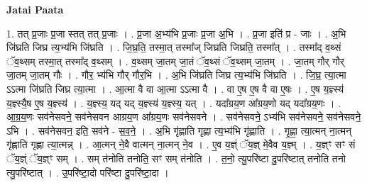 \documentclass[17pt]{extarticle}
\begin{document}
\textbf{Jatai Paata} \newline

1. तत् प्र॒जाः प्र॒जा स्तत् तत् प्र॒जाः । . प्र॒जा अ॒भ्य॑भि प्र॒जाः प्र॒जा अ॒भि । . प्र॒जा इति॑ प्र - जाः । . अ॒भि जि॑घ्रति जिघ्र त्य॒भ्य॑भि जि॑घ्रति । . जि॒घ्र॒ति॒ तस्मा॒त् तस्मा᳚ज् जिघ्रति जिघ्रति॒ तस्मा᳚त् । . तस्मा᳚द् व॒थ्सं ॅव॒थ्सम् तस्मा॒त् तस्मा᳚द् व॒थ्सम् । . व॒थ्सम् जा॒तम् जा॒तं ॅव॒थ्सं ॅव॒थ्सम् जा॒तम् । . जा॒तम् गौर् गौर् जा॒तम् जा॒तम् गौः । . गौर॒ भ्य॑भि गौर् गौर॒भि । . अ॒भि जि॑घ्रति जिघ्र त्य॒भ्य॑भि जि॑घ्रति । . जि॒घ्र॒ त्या॒त्मा ऽऽत्मा जि॑घ्रति जिघ्र त्या॒त्मा । . आ॒त्मा वै वा आ॒त्मा ऽऽत्मा वै । . वा ए॒ष ए॒ष वै वा ए॒षः । . ए॒ष य॒ज्ञ्स्य॑ य॒ज्ञ्स्यै॒ष ए॒ष य॒ज्ञ्स्य॑ । . य॒ज्ञ्स्य॒ यद् यद् य॒ज्ञ्स्य॑ य॒ज्ञ्स्य॒ यत् । . यदा᳚ग्रय॒ण आ᳚ग्रय॒णो यद् यदा᳚ग्रय॒णः । . आ॒ग्र॒य॒णः सव॑नेसवने॒ सव॑नेसवन आग्रय॒ण आ᳚ग्रय॒णः सव॑नेसवने । . सव॑नेसवने॒ ऽभ्य॑भि सव॑नेसवने॒ सव॑नेसवने॒ ऽभि । . सव॑नेसवन॒ इति॒ सव॑ने - स॒व॒ने॒ । . अ॒भि गृ॑ह्णाति गृह्णा त्य॒भ्य॑भि गृ॑ह्णाति । . गृ॒ह्णा॒ त्या॒त्मन् ना॒त्मन् गृ॑ह्णाति गृह्णा त्या॒त्मन्न् । . आ॒त्मन् ने॒वै वात्मन् ना॒त्मन् ने॒व । . ए॒व य॒ज्ञ्ं ॅय॒ज्ञ् मे॒वैव य॒ज्ञ्म् । . य॒ज्ञ्ꣳ सꣳ सं ॅय॒ज्ञ्ं ॅय॒ज्ञ्ꣳ सम् । . सम् त॑नोति तनोति॒ सꣳ सम् त॑नोति । . त॒नो॒ त्यु॒परि॑ष्टा दु॒परि॑ष्टात् तनोति तनो त्यु॒परि॑ष्टात् । . उ॒परि॑ष्टा॒दो परि॑ष्टा दु॒परि॑ष्टा॒दा । \newline
\end{document}

